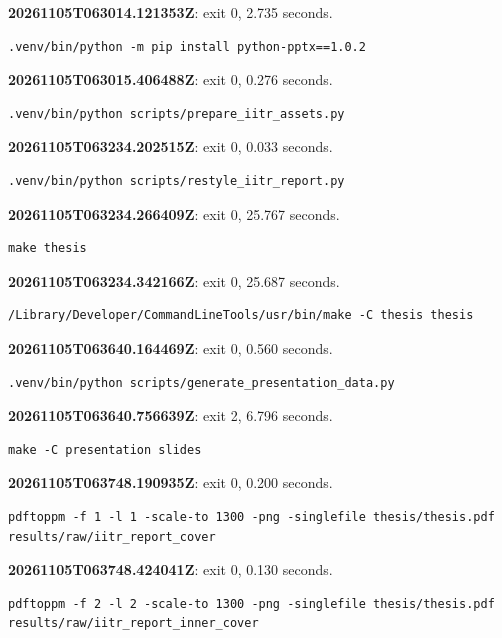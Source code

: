 \noindent\textbf{20261105T063014.121353Z}: exit 0, 2.735 seconds.
\begin{lstlisting}[numbers=none]
.venv/bin/python -m pip install python-pptx==1.0.2
\end{lstlisting}

\noindent\textbf{20261105T063015.406488Z}: exit 0, 0.276 seconds.
\begin{lstlisting}[numbers=none]
.venv/bin/python scripts/prepare_iitr_assets.py
\end{lstlisting}

\noindent\textbf{20261105T063234.202515Z}: exit 0, 0.033 seconds.
\begin{lstlisting}[numbers=none]
.venv/bin/python scripts/restyle_iitr_report.py
\end{lstlisting}

\noindent\textbf{20261105T063234.266409Z}: exit 0, 25.767 seconds.
\begin{lstlisting}[numbers=none]
make thesis
\end{lstlisting}

\noindent\textbf{20261105T063234.342166Z}: exit 0, 25.687 seconds.
\begin{lstlisting}[numbers=none]
/Library/Developer/CommandLineTools/usr/bin/make -C thesis thesis
\end{lstlisting}

\noindent\textbf{20261105T063640.164469Z}: exit 0, 0.560 seconds.
\begin{lstlisting}[numbers=none]
.venv/bin/python scripts/generate_presentation_data.py
\end{lstlisting}

\noindent\textbf{20261105T063640.756639Z}: exit 2, 6.796 seconds.
\begin{lstlisting}[numbers=none]
make -C presentation slides
\end{lstlisting}

\noindent\textbf{20261105T063748.190935Z}: exit 0, 0.200 seconds.
\begin{lstlisting}[numbers=none]
pdftoppm -f 1 -l 1 -scale-to 1300 -png -singlefile thesis/thesis.pdf results/raw/iitr_report_cover
\end{lstlisting}

\noindent\textbf{20261105T063748.424041Z}: exit 0, 0.130 seconds.
\begin{lstlisting}[numbers=none]
pdftoppm -f 2 -l 2 -scale-to 1300 -png -singlefile thesis/thesis.pdf results/raw/iitr_report_inner_cover
\end{lstlisting}


